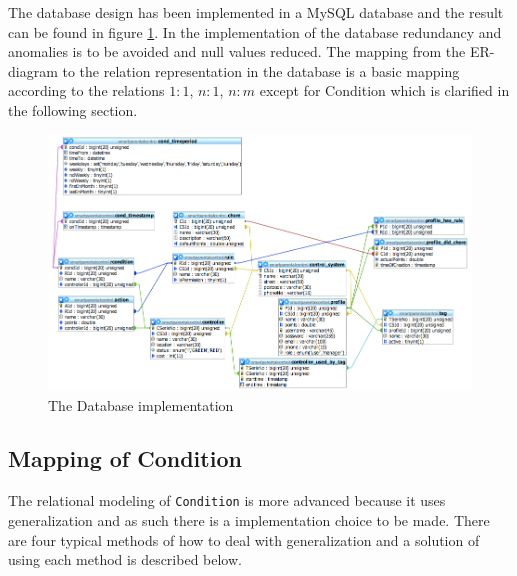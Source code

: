 The database design has been implemented in a MySQL database and the result can be found in figure \ref{fig:databaseDiagram}. In the implementation of the database redundancy and anomalies is to be avoided and null values reduced. 
The mapping from the ER-diagram to the relation representation in the database is a basic mapping according to the relations $1:1$, $n:1$, $n:m$ except for Condition which is clarified in the following section. \citep{DatabaseKilde}

\begin{figure}
	\centering
		\includegraphics[width=1.50\textwidth,  angle=90]{images/databaseDiagram.jpg}
	\caption{The Database implementation}
	\label{fig:databaseDiagram}
\end{figure}

\subsection{Mapping of Condition}
\label{subsec:mappRule}
The relational modeling of \texttt{Condition} is more advanced because it uses generalization and as such there is a implementation choice to be made. There are four typical methods of how to deal with generalization and a solution of using each method is described below.\citep{DatabaseKilde}

